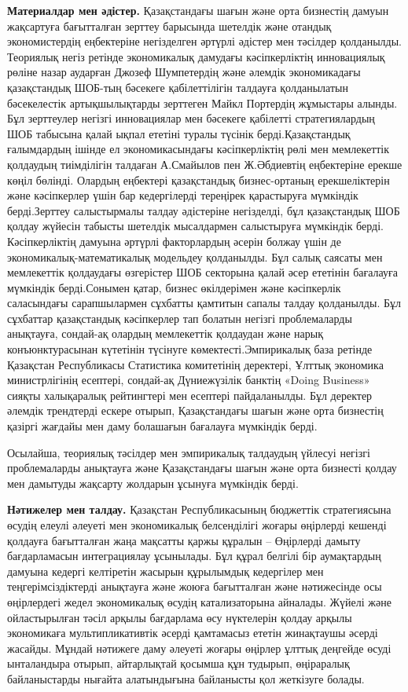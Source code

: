 \begin{multicols}{2}
{\bfseries Материалдар мен әдістер.} Қазақстандағы шағын және орта
бизнестің дамуын жақсартуға бағытталған зерттеу барысында шетелдік және
отандық экономистердің еңбектеріне негізделген әртүрлі әдістер мен
тәсілдер қолданылды. Теориялық негіз ретінде экономикалық дамудағы
кәсіпкерліктің инновациялық рөліне назар аударған Джозеф Шумпетердің
және әлемдік экономикадағы қазақстандық ШОБ-тың бәсекеге қабілеттілігін
талдауға қолданылатын бәсекелестік артықшылықтарды зерттеген Майкл
Портердің жұмыстары алынды. Бұл зерттеулер негізгі инновациялар мен
бәсекеге қабілетті стратегиялардың ШОБ табысына қалай ықпал ететіні
туралы түсінік берді.Қазақстандық ғалымдардың ішінде ел экономикасындағы
кәсіпкерліктің рөлі мен мемлекеттік қолдаудың тиімділігін талдаған
А.Смайылов пен Ж.Әбдиевтің еңбектеріне ерекше көңіл бөлінді. Олардың
еңбектері қазақстандық бизнес-ортаның ерекшеліктерін және кәсіпкерлер
үшін бар кедергілерді тереңірек қарастыруға мүмкіндік берді.Зерттеу
салыстырмалы талдау әдістеріне негізделді, бұл қазақстандық ШОБ қолдау
жүйесін табысты шетелдік мысалдармен салыстыруға мүмкіндік берді.
Кәсіпкерліктің дамуына әртүрлі факторлардың әсерін болжау үшін де
экономикалық-математикалық модельдеу қолданылды. Бұл салық саясаты мен
мемлекеттік қолдаудағы өзгерістер ШОБ секторына қалай әсер ететінін
бағалауға мүмкіндік берді.Сонымен қатар, бизнес өкілдерімен және
кәсіпкерлік саласындағы сарапшылармен сұхбатты қамтитын сапалы талдау
қолданылды. Бұл сұхбаттар қазақстандық кәсіпкерлер тап болатын негізгі
проблемаларды анықтауға, сондай-ақ олардың мемлекеттік қолдаудан және
нарық конъюнктурасынан күтетінін түсінуге көмектесті.Эмпирикалық база
ретінде Қазақстан Республикасы Статистика комитетінің деректері, Ұлттық
экономика министрлігінің есептері, сондай-ақ Дүниежүзілік банктің «Doing
Business» сияқты халықаралық рейтингтері мен есептері пайдаланылды. Бұл
деректер әлемдік трендтерді ескере отырып, Қазақстандағы шағын және орта
бизнестің қазіргі жағдайы мен даму болашағын бағалауға мүмкіндік берді.

Осылайша, теориялық тәсілдер мен эмпирикалық талдаудың үйлесуі негізгі
проблемаларды анықтауға және Қазақстандағы шағын және орта бизнесті
қолдау мен дамытуды жақсарту жолдарын ұсынуға мүмкіндік берді.

{\bfseries Нәтижелер мен талдау.} Қазақстан Республикасының бюджеттік
стратегиясына өсудің елеулі әлеуеті мен экономикалық белсенділігі жоғары
өңірлерді кешенді қолдауға бағытталған жаңа мақсатты қаржы құралын --
Өңірлерді дамыту бағдарламасын интеграциялау ұсынылады. Бұл құрал
белгілі бір аумақтардың дамуына кедергі келтіретін жасырын құрылымдық
кедергілер мен теңгерімсіздіктерді анықтауға және жоюға бағытталған және
нәтижесінде осы өңірлердегі жедел экономикалық өсудің катализаторына
айналады. Жүйелі және ойластырылған тәсіл арқылы бағдарлама өсу
нүктелерін қолдау арқылы экономикаға мультипликативтік әсерді қамтамасыз
ететін жинақтаушы әсерді жасайды. Мұндай нәтижеге даму әлеуеті жоғары
өңірлер ұлттық деңгейде өсуді ынталандыра отырып, айтарлықтай қосымша
құн тудырып, өңіраралық байланыстарды нығайта алатындығына байланысты
қол жеткізуге болады.


\end{multicols}
